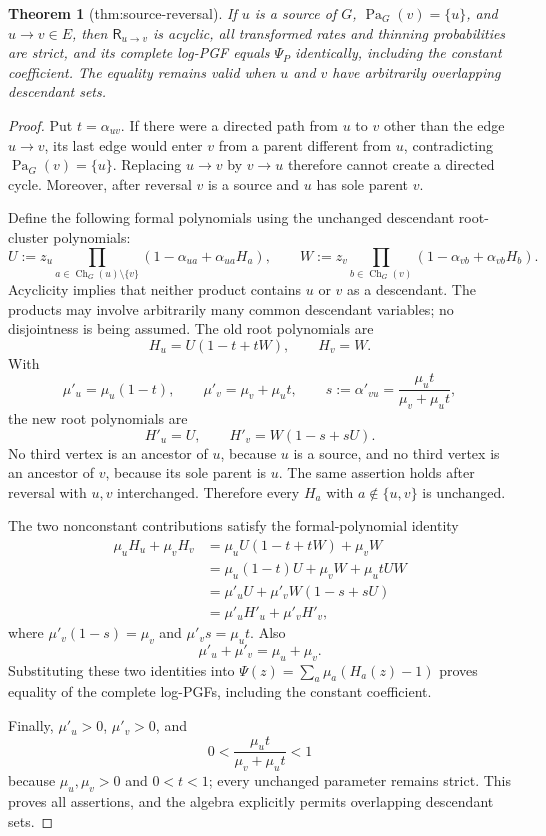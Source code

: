 \documentclass{article}
\newtheorem{theorem}{Theorem}
\begin{document}
\begin{theorem}[thm:source-reversal]\label{thm:source-reversal}
If \(u\) is a source of \(G\), \(\operatorname{Pa}_G(v)=\{u\}\), and \(u\to v\in E\), then \(\mathsf R_{u\to v}\) is acyclic, all transformed rates and thinning probabilities are strict, and its complete log-PGF equals \(\Psi_P\) identically, including the constant coefficient. The equality remains valid when \(u\) and \(v\) have arbitrarily overlapping descendant sets.
\end{theorem}
\begin{proof}
Put \(t=\alpha_{uv}\).  If there were a directed path from \(u\) to \(v\) other than the edge \(u\to v\), its last edge would enter \(v\) from a parent different from \(u\), contradicting \(\operatorname{Pa}_G(v)=\{u\}\).  Replacing \(u\to v\) by \(v\to u\) therefore cannot create a directed cycle.  Moreover, after reversal \(v\) is a source and \(u\) has sole parent \(v\).

Define the following formal polynomials using the unchanged descendant root-cluster polynomials:
\[
 U:=z_u\prod_{a\in\operatorname{Ch}_G(u)\setminus\{v\}}
       (1-\alpha_{ua}+\alpha_{ua}H_a),
 \qquad
 W:=z_v\prod_{b\in\operatorname{Ch}_G(v)}
       (1-\alpha_{vb}+\alpha_{vb}H_b).
\]
Acyclicity implies that neither product contains \(u\) or \(v\) as a descendant.  The products may involve arbitrarily many common descendant variables; no disjointness is being assumed.  The old root polynomials are
\[
 H_u=U(1-t+tW),\qquad H_v=W.
\]
With
\[
 \mu'_u=\mu_u(1-t),\qquad
 \mu'_v=\mu_v+\mu_ut,
 \qquad
 s:=\alpha'_{vu}=\frac{\mu_ut}{\mu_v+\mu_ut},
\]
the new root polynomials are
\[
 H'_u=U,\qquad H'_v=W(1-s+sU).
\]
No third vertex is an ancestor of \(u\), because \(u\) is a source, and no third vertex is an ancestor of \(v\), because its sole parent is \(u\).  The same assertion holds after reversal with \(u,v\) interchanged.  Therefore every \(H_a\) with \(a\notin\{u,v\}\) is unchanged.

The two nonconstant contributions satisfy the formal-polynomial identity
\[
\begin{aligned}
 \mu_uH_u+\mu_vH_v
 &=\mu_uU(1-t+tW)+\mu_vW\\
 &=\mu_u(1-t)U+\mu_vW+\mu_utUW\\
 &=\mu'_uU+\mu'_vW(1-s+sU)\\
 &=\mu'_uH'_u+\mu'_vH'_v,
\end{aligned}
\]
where \(\mu'_v(1-s)=\mu_v\) and \(\mu'_vs=\mu_ut\).  Also
\[
 \mu'_u+\mu'_v=\mu_u+\mu_v.
\]
Substituting these two identities into
\(\Psi(z)=\sum_a\mu_a(H_a(z)-1)\) proves equality of the complete log-PGFs, including the constant coefficient.

Finally, \(\mu'_u>0\), \(\mu'_v>0\), and
\[
 0<\frac{\mu_ut}{\mu_v+\mu_ut}<1
\]
because \(\mu_u,\mu_v>0\) and \(0<t<1\); every unchanged parameter remains strict.  This proves all assertions, and the algebra explicitly permits overlapping descendant sets.
\end{proof}
\end{document}
